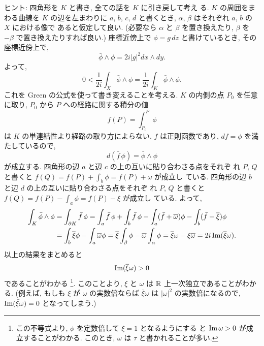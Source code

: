 \documentclass[12pt,twoside]{jarticle}
\def\bdr{\partial}
\def\R{{\Bbb R}} %
\def\Impart{\mathop{\text{\rm Im}}\nolimits} %
\def\Im{\mathop{\text{\rm Im}}\nolimits}     %
\begin{document}
\noindent ヒント: 四角形を $K$ と書き, 全ての話を $K$ に引き戻して考え
る. $K$ の周囲をまわる曲線を $K$ の辺を左まわりに $a$, $b$, $c$, $d$ %
と書くとき, $\alpha$, $\beta$ はそれぞれ $a$, $b$ の $X$ における像で %
あると仮定して良い. (必要なら $\alpha$ と $\beta$ を置き換えたり, %
$\beta$ を $-\beta$ で置き換えたりすれば良い.) 座標近傍上で 
$\phi=g\,dz$ と書けているとき, その座標近傍上で,
\[ %
  \bar\phi\wedge\phi = 2i|g|^2 dx\wedge dy.
\]
よって,
\[
  0 
  < \frac{1}{2i} \int_X \bar\phi\wedge\phi
  = \frac{1}{2i} \int_K \bar\phi\wedge\phi.
\] %
これを Green の公式を使って書き変えることを考える. $K$ の内側の点 %
$P_0$ を任意に取り, $P_0$ から $P$ への経路に関する積分の値
\[
  f(P) = \int_{P_0}^P \phi
\]
は $K$ の単連結性より経路の取り方によらない. $f$ は正則函数であり,
$df=\phi$ を満たしているので,
\[
  d(\bar f\,\phi) = \bar\phi\wedge\phi
\] %
が成立する. 四角形の辺 $a$ と辺 $c$ の上の互いに貼り合わさる点をそれぞ
れ $P$, $Q$ と書くと $f(Q)=f(P)+\int_b\phi=f(P)+\omega$ が成立し
ている. 四角形の辺 $b$ と辺 $d$ の上の互いに貼り合わさる点をそれぞ
れ $P$, $Q$ と書くと $f(Q)=f(P)-\int_a\phi=f(P)-\xi$ が成立し
ている. よって,
\begin{align*}
  \int_K \bar\phi\wedge\phi
  & =
  \int_{\bdr K} \bar f\,\phi
  =
    \int_a\bar f\,\phi 
  + \int_b\bar f\,\phi
  - \int_a(\bar f + \overline\omega)\phi 
  - \int_b(\bar f - \overline\xi)\phi
  \\
  & =
    \int_{b} \overline\xi \phi
  - \int_{a} \overline\omega \phi
  =
    \overline\xi \int_{\beta} \phi
  - \overline\omega \int_{\alpha} \phi
  =
  \overline\xi \omega - \xi \overline\omega
  =
  2i \Impart (\overline\xi \omega).
\end{align*}
以上の結果をまとめると
\[
  \Impart(\overline\xi \omega) > 0
\] %
であることがわかる%
\footnote{この不等式より, $\phi$ を定数倍して $\xi=1$ となるようにする
  と $\Im\omega>0$ が成立することがわかる. このとき, $\omega$ は %
  $\tau$ と書かれることが多い.}. %
このことより, $\xi$ と $\omega$ は $\R$ 上一次独立であることがわかる. 
(例えば, もしも $\xi$ が $\omega$ の実数倍ならば %
$\overline\xi\omega$ は $|\omega|^2$ の実数倍になるので, %
$\Impart(\bar\xi\omega)=0$ となってしまう.)
\end{document}
